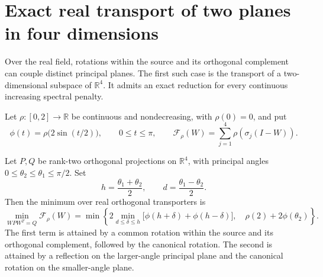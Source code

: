 \section{Exact real transport of two planes in four dimensions}
\label{sec:real-four-dimensional-transport}

Over the real field, rotations within the source and its orthogonal
complement can couple distinct principal planes. The first such case is
the transport of a two-dimensional subspace of $\mathbb R^4$. It admits
an exact reduction for every continuous increasing spectral penalty.

Let $\rho:[0,2]\to\mathbb R$ be continuous and nondecreasing, with
$\rho(0)=0$, and put
\[
 \phi(t)=\rho\bigl(2\sin(t/2)\bigr),\qquad 0\leq t\leq\pi,
 \qquad
 \mathcal F_\rho(W)=\sum_{j=1}^4\rho(\sigma_j(I-W)).
\]

\begin{theorem}
\label{thm:real-four-dimensional-minimum}
Let $P,Q$ be rank-two orthogonal projections on $\mathbb R^4$, with
principal angles $0\leq\theta_2\leq\theta_1\leq\pi/2$. Set
\[
 h=\frac{\theta_1+\theta_2}{2},\qquad
 d=\frac{\theta_1-\theta_2}{2}.
\]
Then the minimum over real orthogonal transporters is
\begin{equation}
 \min_{WPW^T=Q}\mathcal F_\rho(W)
 =\min\left\{
    2\min_{d\leq\delta\leq h}
       \bigl[\phi(h+\delta)+\phi(h-\delta)\bigr],\quad
    \rho(2)+2\phi(\theta_2)
   \right\}.
 \label{eq:real-four-dimensional-minimum}
\end{equation}
The first term is attained by a common rotation within the source and
its orthogonal complement, followed by the canonical rotation. The second
is attained by a reflection on the larger-angle principal plane and the
canonical rotation on the smaller-angle plane.
\end{theorem}

